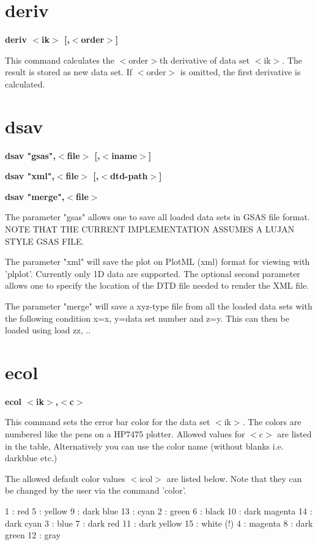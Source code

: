 \section{deriv}
{\bf deriv $ <$ik$> $ [,$ <$order$> $] \par }
\par
\vspace{3pt}
This command calculates the $ <$order$> $th derivative of data set $ <$ik$> $. 
The result is stored as new data set. If $ <$order$> $ is omitted, the 
first derivative is calculated. 
\section{dsav}
{\bf dsav "gsas",$ <$file$> $ [,$ <$iname$> $] \par }
{\bf dsav "xml",$ <$file$> $ [,$ <$dtd-path$> $] \par }
{\bf dsav "merge",$ <$file$> $ \par }
\par
\vspace{3pt}
The parameter "gsas"  allows one to save all loaded data sets 
in GSAS file format. NOTE THAT THE CURRENT IMPLEMENTATION ASSUMES 
A LUJAN STYLE GSAS FILE. 
\par
The parameter "xml" will save the plot on PlotML (xml) format 
for viewing with 'plplot'. Currently only 1D data are supported. 
The optional second parameter allows one to specify the location 
of the DTD file needed to render the XML file. 
\par
The parameter "merge" will save a xyz-type file from all the 
loaded data sets with the following condition x=x, y=data set 
number and z=y. This can then be loaded using load zz, .. 
\section{ecol}
{\bf ecol $ <$ik$> $,$ <$c$> $ \par }
\par
\vspace{3pt}
This command sets the error bar color for the data set $ <$ik$> $. 
The colors are numbered like the pens on a HP7475 plotter. Allowed 
values for $ <$c$> $ are listed in the table, Alternatively you can use 
the color name (without blanks i.e. darkblue etc.) 
\par
The allowed default color values $ <$icol$> $ are listed below. Note 
that they can be changed by the user via the command 'color'. 
\par
\begin{MacVerbatim}
  1 : red       5 : yellow        9 : dark blue      13 : cyan
  2 : green     6 : black        10 : dark magenta   14 : dark cyan
  3 : blue      7 : dark red     11 : dark yellow    15 : white (!)
  4 : magenta   8 : dark green   12 : gray
\end{MacVerbatim}
